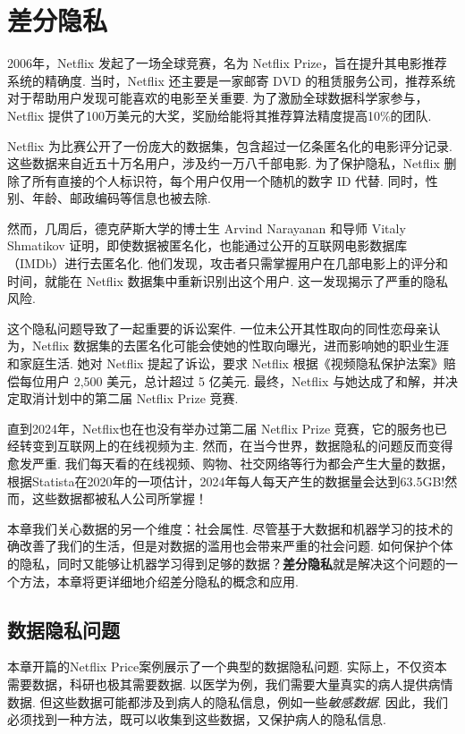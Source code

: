 \chapter{差分隐私}\label{chap:differential-privacy}

2006年，Netflix 发起了一场全球竞赛，名为 Netflix Prize，旨在提升其电影推荐系统的精确度. 当时，Netflix 还主要是一家邮寄 DVD 的租赁服务公司，推荐系统对于帮助用户发现可能喜欢的电影至关重要. 为了激励全球数据科学家参与，Netflix 提供了100万美元的大奖，奖励给能将其推荐算法精度提高10\%的团队. 

Netflix 为比赛公开了一份庞大的数据集，包含超过一亿条匿名化的电影评分记录. 这些数据来自近五十万名用户，涉及约一万八千部电影. 为了保护隐私，Netflix 删除了所有直接的个人标识符，每个用户仅用一个随机的数字 ID 代替. 同时，性别、年龄、邮政编码等信息也被去除. 

然而，几周后，德克萨斯大学的博士生 Arvind Narayanan 和导师 Vitaly Shmatikov 证明，即使数据被匿名化，也能通过公开的互联网电影数据库（IMDb）进行去匿名化. 他们发现，攻击者只需掌握用户在几部电影上的评分和时间，就能在 Netflix 数据集中重新识别出这个用户. 这一发现揭示了严重的隐私风险. 

这个隐私问题导致了一起重要的诉讼案件. 一位未公开其性取向的同性恋母亲认为，Netflix 数据集的去匿名化可能会使她的性取向曝光，进而影响她的职业生涯和家庭生活. 她对 Netflix 提起了诉讼，要求 Netflix 根据《视频隐私保护法案》赔偿每位用户 2,500 美元，总计超过 5 亿美元. 最终，Netflix 与她达成了和解，并决定取消计划中的第二届 Netflix Prize 竞赛. 

直到2024年，Netflix也在也没有举办过第二届 Netflix Prize 竞赛，它的服务也已经转变到互联网上的在线视频为主. 然而，在当今世界，数据隐私的问题反而变得愈发严重. 我们每天看的在线视频、购物、社交网络等行为都会产生大量的数据，根据Statista在2020年的一项估计，2024年每人每天产生的数据量会达到63.5GB!然而，这些数据都被私人公司所掌握！

本章我们关心数据的另一个维度：社会属性. 尽管基于大数据和机器学习的技术的确改善了我们的生活，但是对数据的滥用也会带来严重的社会问题. 如何保护个体的隐私，同时又能够让机器学习得到足够的数据？\textbf{差分隐私}就是解决这个问题的一个方法，本章将更详细地介绍差分隐私的概念和应用. 

\section{数据隐私问题}

本章开篇的Netflix Price案例展示了一个典型的数据隐私问题. 实际上，不仅资本需要数据，科研也极其需要数据. 以医学为例，我们需要大量真实的病人提供病情数据. 但这些数据可能都涉及到病人的隐私信息，例如一些\emph{敏感数据}. 因此，我们必须找到一种方法，既可以收集到这些数据，又保护病人的隐私信息.

